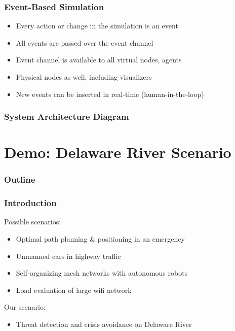 \documentclass[mathserif,usenames,dvipsnames]{beamer}
\begin{document}
\frame
{
    \frametitle{Event-Based Simulation}
    \begin{itemize}
        \item Every action or change in the simulation is an event
        \item All events are passed over the event channel
        \item Event channel is available to all virtual nodes, agents
        \item Physical nodes as well, including visualizers
        \item New events can be inserted in real-time (human-in-the-loop)
    \end{itemize}
}

\frame
{
    \frametitle{System Architecture Diagram}
    \begin{center}
    \begin{figure}
        \resizebox{0.8\textwidth}{!}{}
    \end{figure}
    \end{center}
}


\section{Demo: Delaware River Scenario}
\frame
{
    \frametitle{Outline}
    \tableofcontents
}

\frame
{
    \frametitle{Introduction}
    Possible scenarios:
    \begin{itemize}
        \item Optimal path planning \& positioning in an emergency
        \item Unmanned cars in highway traffic
        \item Self-organizing mesh networks with autonomous robots
        \item Load evaluation of large wifi network
    \end{itemize}
    Our scenario:
    \begin{itemize}
        \item Threat detection and crisis avoidance on Delaware River
    \end{itemize} 
}
\end{document}
